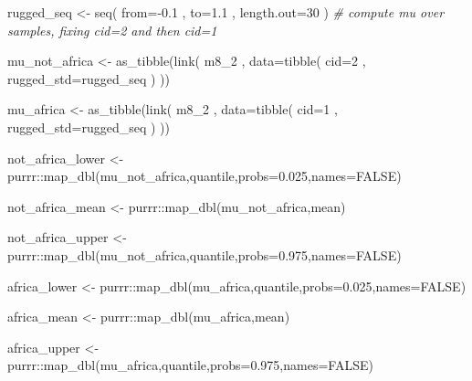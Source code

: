 \documentclass[
]{book}
\newenvironment{Shaded}{\begin{snugshade}}{\end{snugshade}}
\newcommand{\AttributeTok}[1]{\textcolor[rgb]{0.77,0.63,0.00}{#1}}
\newcommand{\CommentTok}[1]{\textcolor[rgb]{0.56,0.35,0.01}{\textit{#1}}}
\newcommand{\ConstantTok}[1]{\textcolor[rgb]{0.00,0.00,0.00}{#1}}
\newcommand{\DecValTok}[1]{\textcolor[rgb]{0.00,0.00,0.81}{#1}}
\newcommand{\FloatTok}[1]{\textcolor[rgb]{0.00,0.00,0.81}{#1}}
\newcommand{\FunctionTok}[1]{\textcolor[rgb]{0.00,0.00,0.00}{#1}}
\newcommand{\NormalTok}[1]{#1}
\newcommand{\OtherTok}[1]{\textcolor[rgb]{0.56,0.35,0.01}{#1}}
\newcommand{\SpecialCharTok}[1]{\textcolor[rgb]{0.00,0.00,0.00}{#1}}
\begin{document}
\begin{Shaded}
\begin{Highlighting}[]
\NormalTok{rugged\_seq }\OtherTok{\textless{}{-}} \FunctionTok{seq}\NormalTok{( }\AttributeTok{from=}\SpecialCharTok{{-}}\FloatTok{0.1}\NormalTok{ , }\AttributeTok{to=}\FloatTok{1.1}\NormalTok{ , }\AttributeTok{length.out=}\DecValTok{30}\NormalTok{ ) }\CommentTok{\# compute mu over samples, fixing cid=2 and then cid=1 }

\NormalTok{mu\_not\_africa }\OtherTok{\textless{}{-}} \FunctionTok{as\_tibble}\NormalTok{(}\FunctionTok{link}\NormalTok{( m8\_2 ,}
\AttributeTok{data=}\FunctionTok{tibble}\NormalTok{( }\AttributeTok{cid=}\DecValTok{2}\NormalTok{ , }\AttributeTok{rugged\_std=}\NormalTok{rugged\_seq ) ))}

\NormalTok{mu\_africa }\OtherTok{\textless{}{-}} \FunctionTok{as\_tibble}\NormalTok{(}\FunctionTok{link}\NormalTok{( m8\_2 ,}
\AttributeTok{data=}\FunctionTok{tibble}\NormalTok{( }\AttributeTok{cid=}\DecValTok{1}\NormalTok{ , }\AttributeTok{rugged\_std=}\NormalTok{rugged\_seq ) ))}

\NormalTok{not\_africa\_lower }\OtherTok{\textless{}{-}}\NormalTok{ purrr}\SpecialCharTok{::}\FunctionTok{map\_dbl}\NormalTok{(mu\_not\_africa,quantile,}\AttributeTok{probs=}\FloatTok{0.025}\NormalTok{,}\AttributeTok{names=}\ConstantTok{FALSE}\NormalTok{)}

\NormalTok{not\_africa\_mean }\OtherTok{\textless{}{-}}\NormalTok{ purrr}\SpecialCharTok{::}\FunctionTok{map\_dbl}\NormalTok{(mu\_not\_africa,mean)}

\NormalTok{not\_africa\_upper }\OtherTok{\textless{}{-}}\NormalTok{ purrr}\SpecialCharTok{::}\FunctionTok{map\_dbl}\NormalTok{(mu\_not\_africa,quantile,}\AttributeTok{probs=}\FloatTok{0.975}\NormalTok{,}\AttributeTok{names=}\ConstantTok{FALSE}\NormalTok{)}



\NormalTok{africa\_lower }\OtherTok{\textless{}{-}}\NormalTok{ purrr}\SpecialCharTok{::}\FunctionTok{map\_dbl}\NormalTok{(mu\_africa,quantile,}\AttributeTok{probs=}\FloatTok{0.025}\NormalTok{,}\AttributeTok{names=}\ConstantTok{FALSE}\NormalTok{)}

\NormalTok{africa\_mean }\OtherTok{\textless{}{-}}\NormalTok{ purrr}\SpecialCharTok{::}\FunctionTok{map\_dbl}\NormalTok{(mu\_africa,mean)}

\NormalTok{africa\_upper }\OtherTok{\textless{}{-}}\NormalTok{ purrr}\SpecialCharTok{::}\FunctionTok{map\_dbl}\NormalTok{(mu\_africa,quantile,}\AttributeTok{probs=}\FloatTok{0.975}\NormalTok{,}\AttributeTok{names=}\ConstantTok{FALSE}\NormalTok{)}



\end{Highlighting}
\end{Shaded}
\end{document}
